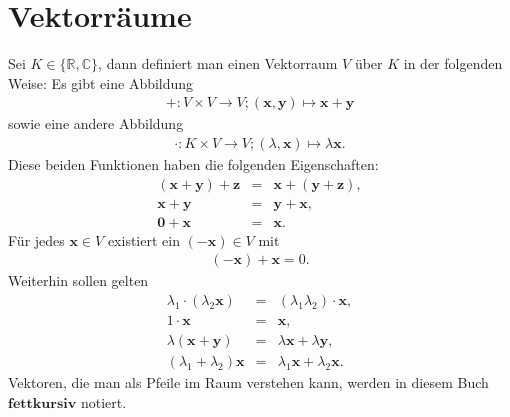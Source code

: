 \documentclass{book}
\begin{document}
\section{Vektorräume}
\label{sec:vektorraeume}

Sei $K\in\{\mathbb{R}, \mathbb{C}\}$, dann definiert man einen Vektorraum $V$ über $K$ in der folgenden Weise:
%
Es gibt eine Abbildung
\begin{eqnarray}
+ :V\times V\to V;\left(\mathbf{x}, \mathbf{y}\right)\mapsto \mathbf{x} + \mathbf{y}
\end{eqnarray}
%
sowie eine andere Abbildung
%
\begin{eqnarray}
\cdot :K\times V\to V;\left(\lambda, \mathbf{x}\right)\mapsto\lambda \mathbf{x}.
\end{eqnarray}
%
Diese beiden Funktionen haben die folgenden Eigenschaften:
%
\begin{eqnarray}
\left(\mathbf{x} + \mathbf{y}\right) + \mathbf{z} & = & \mathbf{x} + \left(\mathbf{y} + \mathbf{z}\right),\\
\mathbf{x} + \mathbf{y} & = & \mathbf{y} + \mathbf{x},\\
\mathbf{0} + \mathbf{x} & = & \mathbf{x}.
\end{eqnarray}
%
Für jedes $\mathbf{x}\in V$ existiert ein $\left(-\mathbf{x}\right)\in V$ mit
%
\begin{eqnarray}
\left(-\mathbf{x}\right) + \mathbf{x} = 0.
\end{eqnarray}
%
Weiterhin sollen gelten
%
\begin{eqnarray}
\lambda_1\cdot\left(\lambda_2\mathbf{x}\right) & = & \left(\lambda_1\lambda_2\right)\cdot\mathbf{x},\\
1\cdot\mathbf{x} & = & \mathbf{x},\\
\lambda\left(\mathbf{x} + \mathbf{y}\right) & = & \lambda\mathbf{x} + \lambda\mathbf{y},\\
\left(\lambda_1 + \lambda_2\right)\mathbf{x} & = & \lambda_1\mathbf{x} + \lambda_2\mathbf{x}.
\end{eqnarray}
%
Vektoren, die man als Pfeile im Raum verstehen kann, werden in diesem Buch $\mathbf{fettkursiv}$ notiert.
\end{document}

